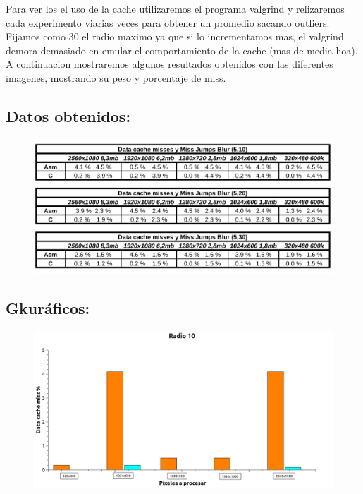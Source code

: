 Para ver los el uso de la cache utilizaremos el programa valgrind y relizaremos cada experimento viarias veces para obtener un promedio sacando outliers. Fijamos como 30 el radio maximo ya que si lo incrementamos mas, el  valgrind demora demasiado en emular el comportamiento de la cache (mas de media hoa). A continuacion mostraremos algunos resultados obtenidos con las diferentes imagenes, mostrando su peso y porcentaje de miss. \\

\subsection{Datos obtenidos:}

\begin{figure}[H]
\begin{center}
  \includegraphics[width=\linewidth]{cache/tabla.png}
\end{center}
\end{figure}

\subsection{Gkuráficos:} 


\begin{figure}[H]
\begin{center}
  \includegraphics[width=\linewidth]{cache/Radio10.png}
\end{center}
\end{figure}

